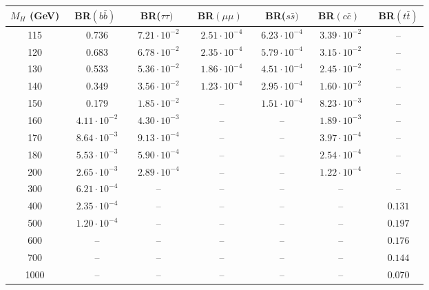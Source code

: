 \begin{table}[htbp]
\begin{center}
\renewcommand{\arraystretch}{1.25}
\begin{tabular}{|c||c|c|c|c|c|c|}\hline
$M_H$ (GeV) & \ BR$(b\bar b)$ \ & \ BR($\tau \tau)$ \ &   \ BR$(\mu \mu)$ \ & 
BR($s \bar s)$ & \  BR$(c \bar c)$ \ & BR$(t \bar t)$ \\ \hline \hline
%
115 & 0.736 & $7.21 \cdot\! 10^{-2}$ & $2.51 \cdot\! 10^{-4}$ & $6.23 \cdot\! 
10^{-4}$ & $3.39 \cdot\! 10^{-2}$ & -- \\
%
120 & 0.683 & $6.78 \cdot\! 10^{-2}$ & $2.35 \cdot\! 10^{-4}$ & $5.79 \cdot\! 
10^{-4}$ & $3.15 \cdot\! 10^{-2}$ & -- \\
%
130 & 0.533 & $5.36 \cdot\! 10^{-2}$ & $1.86 \cdot\! 10^{-4}$ & $4.51 \cdot\! 
10^{-4}$ & $2.45 \cdot\! 10^{-2}$ & -- \\
%
140 & 0.349 & $3.56 \cdot\! 10^{-2}$ & $1.23 \cdot\! 10^{-4}$ & $2.95 \cdot\! 
10^{-4}$ & $1.60 \cdot\! 10^{-2}$ & -- \\
%
150 & 0.179 & $1.85 \cdot\! 10^{-2}$ & -- & $1.51 \cdot\! 10^{-4}$ & $8.23 
\cdot\! 10^{-3}$ & -- \\
%
160 & $4.11 \cdot \! 10^{-2}$ & $4.30 \cdot\! 10^{-3}$ & -- & -- & $1.89 
\cdot\! 10^{-3}$ & -- \\
%
170 & $8.64 \cdot\! 10^{-3}$ & $9.13 \cdot\! 10^{-4}$ & -- & -- & $3.97 
\cdot\! 10^{-4}$ & -- \\
%
180 & $5.53 \cdot\! 10^{-3}$ & $5.90 \cdot\! 10^{-4}$ & -- & -- & $2.54 
\cdot\! 10^{-4}$ & -- \\
%
200 & $2.65 \cdot\! 10^{-3}$ & $2.89 \cdot\! 10^{-4}$ & -- & -- & $1.22 
\cdot\! 10^{-4}$ & -- \\
%
300 & $6.21 \cdot\! 10^{-4}$ & -- & -- & -- & -- & -- \\
%
400 & $2.35 \cdot\! 10^{-4}$ & -- & -- & -- & -- & $0.131$ \\
%
500 & $1.20 \cdot\! 10^{-4}$ & -- & -- & -- & -- & $0.197$ \\
%
600 & -- & -- & -- & -- & -- & $0.176$ \\
%
700 & -- & -- & -- & -- & -- & $0.144$ \\
%
1000 & -- & -- & -- & -- & -- & $0.070$ \\ \hline
\end{tabular}
\end{center}
\vspace*{0mm}
\end{table}

